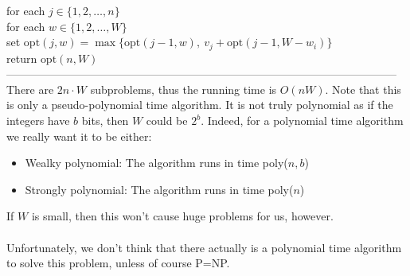 \documentclass{article}
\newcommand{\x}{\cdot}
\newcommand{\opt}{\text{opt}}
\begin{document}
	\hspace*{7mm} for each $j \in \{1, 2, \dots, n\}$\\
	\hspace*{14mm} for each $w \in \{1, 2, \dots, W\}$\\
	\hspace*{21mm} set $\opt(j, w) = \max\{\opt(j-1, w),\ v_j + \opt(j-1, W-w_i)\}$\\
	\hspace*{7mm} return $\opt(n, W)$\\
---------------------------------------------------------------------------------------------------------\\
There are $2n\x W$ subproblems, thus the running time is $O(nW)$. Note that this is only a pseudo-polynomial time algorithm. It is not truly polynomial as if the integers have $b$ bits, then $W$ could be $2^b$. Indeed, for a polynomial time algorithm we really want it to be either:
\begin{itemize}
	\item Wealky polynomial: The algorithm runs in time poly($n, b$)
	\item Strongly polynomial: The algorithm runs in time poly($n$)
\end{itemize}
If $W$ is small, then this won't cause huge problems for us, however.\\\\
Unfortunately, we don't think that there actually is a polynomial time algorithm to solve this problem, unless of course P=NP.
\end{document}
